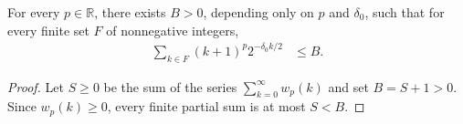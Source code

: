 \begin{lemma}
    \label{thm:area_law_polynomial_finite_sums}
    \leanok
    For every $p\in\mathbb R$, there exists $B>0$, depending only on $p$ and
    $\delta_0$, such that for every finite set $F$ of nonnegative integers,
    \begin{align}
        \sum_{k\in F}(k+1)^p2^{-\delta_0 k/2} & \le B.
    \end{align}
\end{lemma}
\begin{proof}\leanok
    Let $S\ge0$ be the sum of the series $\sum_{k=0}^\infty w_p(k)$ and set
    $B=S+1>0$. Since $w_p(k)\ge0$, every finite partial sum is at most
    $S<B$.
\end{proof}
